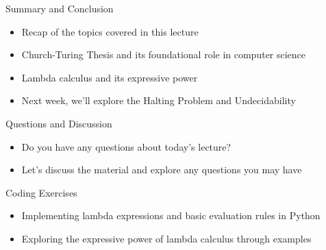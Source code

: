 \documentclass[presentation]{beamer}
\begin{document}
\begin{frame}[label={sec:org4dc75fd}]{Summary and Conclusion}
\begin{itemize}
\item Recap of the topics covered in this lecture
\item Church-Turing Thesis and its foundational role in computer science
\item Lambda calculus and its expressive power
\item Next week, we'll explore the Halting Problem and Undecidability
\end{itemize}
\end{frame}

\begin{frame}[label={sec:org2426a39}]{Questions and Discussion}
\begin{itemize}
\item Do you have any questions about today's lecture?
\item Let's discuss the material and explore any questions you may have
\end{itemize}
\end{frame}

\begin{frame}[label={sec:org308cbc4}]{Coding Exercises}
\begin{itemize}
\item Implementing lambda expressions and basic evaluation rules in Python
\item Exploring the expressive power of lambda calculus through examples
\end{itemize}
\end{frame}
\end{document}
